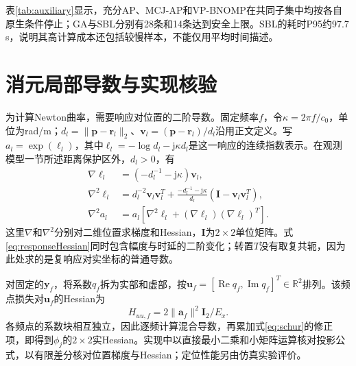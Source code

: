 \documentclass[a4paper,fleqn]{cas-sc}
\numberwithin{equation}{section}
\numberwithin{figure}{section}
\numberwithin{table}{section}
\newcommand{\R}{\mathbb R}
\newcommand{\Rea}{\operatorname{Re}}
\begin{document}

表\ref{tab:auxiliary}显示，充分AP、MCJ-AP和VP-BNOMP在共同子集中均按各自原生条件停止；GA与SBL分别有28条和14条达到安全上限。SBL的耗时P95约97.7\,s，说明其高计算成本还包括较慢样本，不能仅用平均时间描述。

\section{消元局部导数与实现核验}\label{app:derivatives}
为计算Newton曲率，需要响应对位置的二阶导数。固定频率$f$，令$\kappa=2\pi f/c_0$，单位为rad/m；$d_l=\|\bm p-\bm r_l\|_2$、$\bm v_l=(\bm p-\bm r_l)/d_l$沿用正文定义。写$a_l=\exp(\ell_l)$，其中$\ell_l=-\log d_l-\mathrm j\kappa d_l$是这一响应的连续指数表示。在观测模型一节所述距离保护区外，$d_l>0$，有
\begin{align}
 \nabla\ell_l&=(-d_l^{-1}-\mathrm j\kappa)\bm v_l,\\
 \nabla^2\ell_l&=d_l^{-2}\bm v_l\bm v_l^T
 +\frac{-d_l^{-1}-\mathrm j\kappa}{d_l}
 (\bm I-\bm v_l\bm v_l^T),\\
 \nabla^2 a_l&=a_l[\nabla^2\ell_l+(\nabla\ell_l)(\nabla\ell_l)^T].\label{eq:responseHessian}
\end{align}
这里$\nabla$和$\nabla^2$分别对二维位置求梯度和Hessian，$\bm I$为$2\times2$单位矩阵。式\eqref{eq:responseHessian}同时包含幅度与时延的二阶变化；转置$T$没有取复共轭，因为此处求的是复响应对实坐标的普通导数。

对固定的$\bm y_f$，将系数$q_f$拆为实部和虚部，按$\bm u_f=[\Rea q_f,\operatorname{Im}q_f]^T\in\R^2$排列。该频点损失对$\bm u_f$的Hessian为
\begin{equation}
 H_{uu,f}=2\|\bm a_f\|^2\bm I_2/E_x .
\end{equation}
各频点的系数块相互独立，因此逐频计算混合导数，再累加式\eqref{eq:schur}的修正项，即得到$\phi_j$的$2\times2$实Hessian。实现中以直接最小二乘和小矩阵运算核对投影公式，以有限差分核对位置梯度与Hessian；定位性能另由仿真实验评价。


\FloatBarrier


\end{document}
